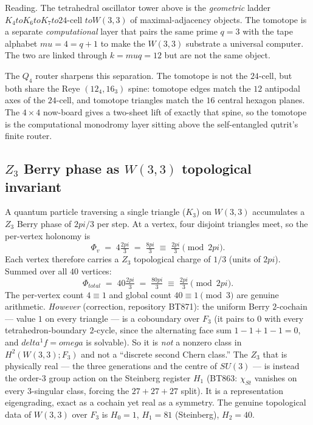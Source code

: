 \documentclass[11pt]{article}
\def\mathbb#1{#1}%
\def\mathrm#1{#1}%
\def\textbf#1{#1}%
\def\text#1{#1}%
\def\omega{omega}%
\def\delta{delta}%
\def\mu{mu}%
\def\Phi#1{Phi#1}%
\def\pi{pi}%
\def\cdot{ }%
\def\to{ to }%
\begin{document}
\textbf{Reading.} The tetrahedral oscillator tower above is the \emph{geometric} ladder $K_4 \to K_6 \to K_7 \to 24$-cell $\to W(3,3)$ of maximal-adjacency objects. The tomotope is a separate \emph{computational} layer that pairs the same prime $q = 3$ with the tape alphabet $\mu = 4 = q+1$ to make the $W(3,3)$ substrate a universal computer. The two are linked through $k = \mu q = 12$ but are not the same object.

The $Q_4$ router sharpens this separation.  The tomotope is not the
$24$-cell, but both share the Reye $(12_4,16_3)$ spine: tomotope edges
match the $12$ antipodal axes of the $24$-cell, and tomotope triangles
match the $16$ central hexagon planes.  The $4\times4$ now-board gives a
two-sheet lift of exactly that spine, so the tomotope is the computational
monodromy layer sitting above the self-entangled qutrit's finite router.

\subsection*{$\mathbb{Z}_3$ Berry phase as $W(3,3)$ topological invariant}

A quantum particle traversing a single triangle ($K_3$) on $W(3,3)$ accumulates a $\mathbb{Z}_3$ Berry phase of $2\pi/3$ per step. At a vertex, four disjoint triangles meet, so the per-vertex holonomy is
\[
\Phi_v \;=\; 4 \cdot \tfrac{2\pi}{3} \;=\; \tfrac{8\pi}{3} \;\equiv\; \tfrac{2\pi}{3} \pmod{2\pi}.
\]
Each vertex therefore carries a $\mathbb{Z}_3$ topological charge of $1/3$ (units of $2\pi$). Summed over all $40$ vertices:
\[
\Phi_{\text{total}} \;=\; 40 \cdot \tfrac{2\pi}{3} \;=\; \tfrac{80\pi}{3} \;\equiv\; \tfrac{2\pi}{3} \pmod{2\pi}.
\]
The per-vertex count $4\equiv 1$ and global count $40\equiv 1 \pmod 3$ are genuine arithmetic. \emph{However} (correction, repository BT871): the uniform Berry $2$-cochain --- value $1$ on every triangle --- is a \textbf{coboundary} over $\mathbb{F}_3$ (it pairs to $0$ with every tetrahedron-boundary $2$-cycle, since the alternating face sum $1-1+1-1=0$, and $\delta^1 f=\omega$ is solvable). So it is \emph{not} a nonzero class in $H^2(W(3,3);\mathbb{F}_3)$ and not a ``discrete second Chern class.'' The $\mathbb{Z}_3$ that is physically real --- the three generations and the centre of $SU(3)$ --- is instead the \textbf{order-$3$ group action on the Steinberg register $H_1$} (BT863: $\chi_{\mathrm{St}}$ vanishes on every $3$-singular class, forcing the $27+27+27$ split). It is a representation eigengrading, exact as a cochain yet real as a symmetry. The genuine topological data of $W(3,3)$ over $\mathbb{F}_3$ is $H_0=1$, $H_1=81$ (Steinberg), $H_2=40$.
\end{document}
